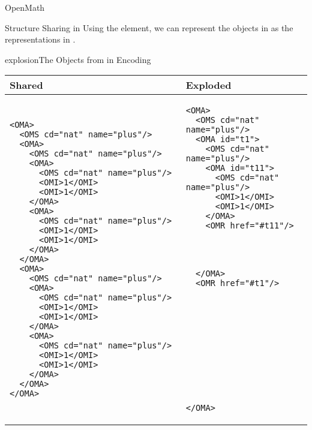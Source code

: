 \begin{omgroup}[id=mobj,short=Mathematical Objects]
\begin{omgroup}[id=openmath]{OpenMath}
\begin{module}[id=OpenMath]
\begin{omgroup}[id=om.structure-sharing]{Structure Sharing in {\openmath}}
Using the {} element, we can represent the {\openmath} objects in
{} as the {\xml} representations in {}.

\begin{myfig}{explosion}{The {\openmath} Objects from {} in {\xml} Encoding}
\begin{tabular}{|p{5.2cm}|p{5.2cm}|}\hline
Shared & Exploded \\\hline\hline
\begin{lstlisting}
<OMA>                        
  <OMS cd="nat" name="plus"/>               
  <OMA>                      
    <OMS cd="nat" name="plus"/>             
    <OMA>                    
      <OMS cd="nat" name="plus"/>           
      <OMI>1</OMI>
      <OMI>1</OMI>
    </OMA>                    
    <OMA>                     
      <OMS cd="nat" name="plus"/>
      <OMI>1</OMI>
      <OMI>1</OMI>
    </OMA>
  </OMA>                      
  <OMA>                       
    <OMS cd="nat" name="plus"/>
    <OMA>                                           
      <OMS cd="nat" name="plus"/>
      <OMI>1</OMI>
      <OMI>1</OMI>
    </OMA>   
    <OMA>
      <OMS cd="nat" name="plus"/>
      <OMI>1</OMI>
      <OMI>1</OMI>
    </OMA>
  </OMA>                      
</OMA>                        
\end{lstlisting}
& 
\begin{lstlisting}
<OMA>
  <OMS cd="nat" name="plus"/>
  <OMA id="t1">
    <OMS cd="nat" name="plus"/>
    <OMA id="t11">
      <OMS cd="nat" name="plus"/>
      <OMI>1</OMI>
      <OMI>1</OMI>
    </OMA>
    <OMR href="#t11"/>




  </OMA>
  <OMR href="#t1"/>












</OMA>
\end{lstlisting}
\\\hline
\end{tabular}
\end{myfig}


\end{omgroup}
\end{module}
\end{omgroup}
\end{omgroup}
